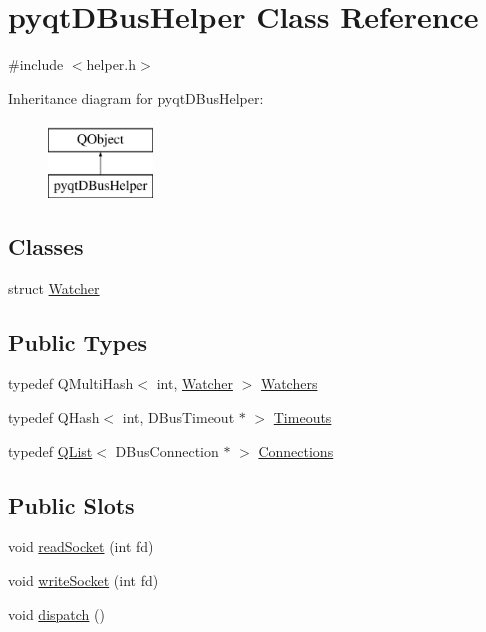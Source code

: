 \hypertarget{classpyqtDBusHelper}{}\section{pyqt\+D\+Bus\+Helper Class Reference}
\label{classpyqtDBusHelper}


{\ttfamily \#include $<$helper.\+h$>$}

Inheritance diagram for pyqt\+D\+Bus\+Helper\+:\begin{figure}[H]
\begin{center}
\leavevmode
\includegraphics[height=2.000000cm]{classpyqtDBusHelper}
\end{center}
\end{figure}
\subsection*{Classes}
\begin{DoxyCompactItemize}
\item 
struct \hyperlink{structpyqtDBusHelper_1_1Watcher}{Watcher}
\end{DoxyCompactItemize}
\subsection*{Public Types}
\begin{DoxyCompactItemize}
\item 
typedef Q\+Multi\+Hash$<$ int, \hyperlink{structpyqtDBusHelper_1_1Watcher}{Watcher} $>$ \hyperlink{classpyqtDBusHelper_adceae209848ccda24b4293514b21ff89}{Watchers}
\item 
typedef Q\+Hash$<$ int, D\+Bus\+Timeout $\ast$ $>$ \hyperlink{classpyqtDBusHelper_a4498e052c335cc2ce0c85de747e25715}{Timeouts}
\item 
typedef \hyperlink{classQList}{Q\+List}$<$ D\+Bus\+Connection $\ast$ $>$ \hyperlink{classpyqtDBusHelper_ae87f85025dbf64fffa05073e6c11a09d}{Connections}
\end{DoxyCompactItemize}
\subsection*{Public Slots}
\begin{DoxyCompactItemize}
\item 
void \hyperlink{classpyqtDBusHelper_a1381dbf635518fecb84496e08a345b96}{read\+Socket} (int fd)
\item 
void \hyperlink{classpyqtDBusHelper_aab4a047b5bba6d2871d8432ff19df912}{write\+Socket} (int fd)
\item 
void \hyperlink{classpyqtDBusHelper_af9c7fd2e2a53269725158fe6100d5c54}{dispatch} ()
\end{DoxyCompactItemize}
